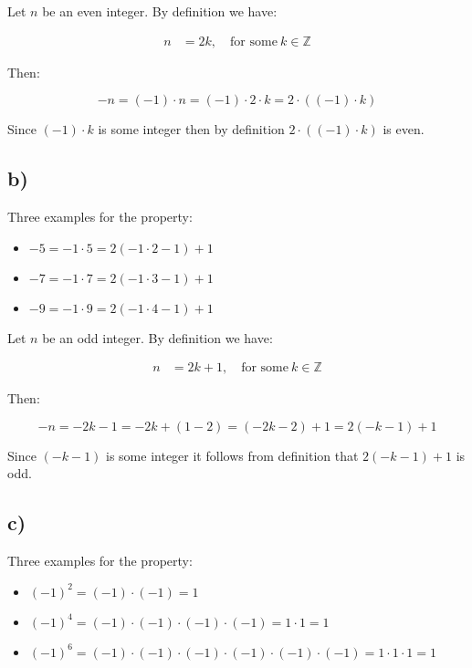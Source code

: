 \documentclass{article}
\begin{document}
Let $n$ be an even integer. By definition we have:

\begin{align*}
	n &= 2k, \quad \mbox{for some}\ k \in \mathbb{Z}
\end{align*}

Then:

\begin{equation*}
	-n = (-1)\cdot n = (-1) \cdot 2 \cdot k = 2 \cdot ((-1)\cdot k)
\end{equation*}

Since $(-1) \cdot k$ is some integer then by definition $2 \cdot ((-1) \cdot k)$ is even.


\subsection*{b)}


Three examples for the property:

\begin{itemize}
	\item $-5 = - 1 \cdot 5 = 2(-1 \cdot 2 -1) + 1$
	\item $-7 = - 1 \cdot 7 = 2(-1 \cdot 3 -1) + 1$ 
	\item $-9 = - 1 \cdot 9 = 2(-1 \cdot 4 - 1) + 1$  
\end{itemize}



Let $n$ be an odd integer. By definition we have:

\begin{align*}
	n &= 2k + 1, \quad \mbox{for some}\ k \in \mathbb{Z}
\end{align*}

Then:

\begin{equation*}
	-n = -2k - 1 = -2k + (1 - 2) = (-2k - 2) + 1 = 2(-k - 1) + 1
\end{equation*}

Since $(-k - 1)$ is some integer it follows from definition that   $2(-k - 1) + 1$
is odd.
\subsection*{c)}


Three examples for the property:

\begin{itemize}
	\item $(-1)^2 = (-1) \cdot (-1) = 1$
	
	\item $(-1)^4 = (-1) \cdot (-1) \cdot (-1) \cdot (-1) = 1 \cdot 1 =  1$

	\item $(-1)^6 = (-1) \cdot (-1) \cdot (-1) \cdot (-1) \cdot (-1) \cdot
		(-1) = 1 \cdot 1 \cdot 1  = 1$
\end{itemize}
\end{document}

